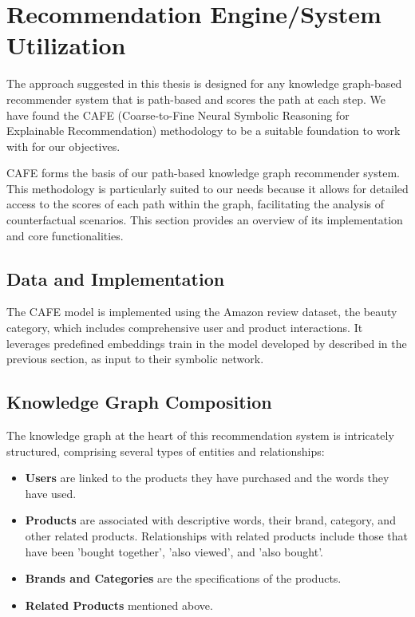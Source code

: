 \section{Recommendation Engine/System Utilization}
The approach suggested in this thesis is designed for any knowledge graph-based
recommender system that is path-based and scores the path at each step. We have found
the CAFE (Coarse-to-Fine Neural Symbolic Reasoning for Explainable
Recommendation) methodology to be a suitable foundation to work with for our objectives.

CAFE forms the basis of our path-based knowledge graph recommender system. This
methodology is particularly suited to our needs because it allows for detailed
access to the scores of each path within the graph, facilitating the analysis of
counterfactual scenarios. This section provides an overview of its
implementation and core functionalities.

\subsection{Data and Implementation}
The CAFE model is implemented using the Amazon review dataset, the beauty category,
which includes comprehensive user and product interactions. It leverages predefined
embeddings train in the model developed by \textcite{ai_learning_2018} described
in the previous section, as input to their symbolic network.
\subsection{Knowledge Graph Composition}
The knowledge graph at the heart of this recommendation system is intricately
structured, comprising several types of entities and relationships:
\begin{itemize}
	\item \textbf{Users} are linked to the products they have purchased and the
		words they have used.

	\item \textbf{Products} are associated with descriptive words, their brand,
		category, and other related products. Relationships with related products
		include those that have been 'bought together', 'also viewed', and 'also bought'.

	\item \textbf{Brands and Categories} are the specifications of the products.

	\item \textbf{Related Products} mentioned above.
\end{itemize}

